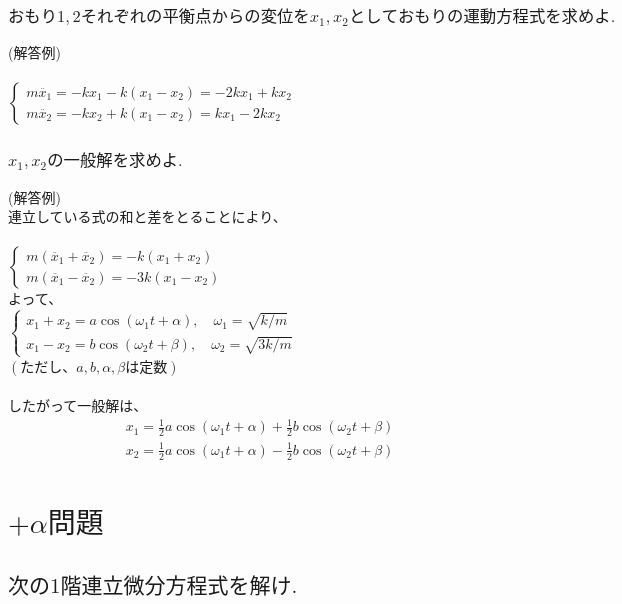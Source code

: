 \documentclass[a4paper,11pt,fleqn]{jarticle}
\begin{document}
\subsubsection{$おもり1,2それぞれの平衡点からの変位をx_1,x_2としておもりの運動方程式を求めよ.$}
(解答例)\\
\\
$\left\{ \begin{array}{l}
m\ddot{x_1}=-kx_1-k(x_1-x_2)=-2kx_1+kx_2 \\
m\ddot{x_2}=-kx_2+k(x_1-x_2)=kx_1-2kx_2
\end{array} \right.$
\subsubsection{$x_1,x_2の一般解を求めよ.$}
(解答例)\\
連立している式の和と差をとることにより、\\
\\
$\left\{ \begin{array}{l}
m(\ddot{x_1}+\ddot{x_2})=-k(x_1+x_2) \\
m(\ddot{x_1}-\ddot{x_2})=-3k(x_1-x_2)
\end{array} \right.$\\
よって、\\
$\left\{ \begin{array}{l}
x_1+x_2=a\cos({\omega}_1t+\alpha),\quad {\omega}_1=\sqrt{k/m} \\
x_1-x_2=b\cos({\omega}_2t+\beta),\quad {\omega}_2=\sqrt{3k/m}
\end{array} \right.$\\
$(ただし、a,b,\alpha ,\beta は定数)$\\
\\
したがって一般解は、
\begin{eqnarray*}
x_1=\frac{1}{2}a\cos({\omega}_1t+\alpha)+\frac{1}{2}b\cos({\omega}_2t+\beta)
\end{eqnarray*}
\begin{eqnarray*}
x_2=\frac{1}{2}a\cos({\omega}_1t+\alpha)-\frac{1}{2}b\cos({\omega}_2t+\beta)
\end{eqnarray*}

\newpage
\section*{$+\alpha 問題$}
\subsection{$次の1階連立微分方程式を解け.$}
\end{document}

